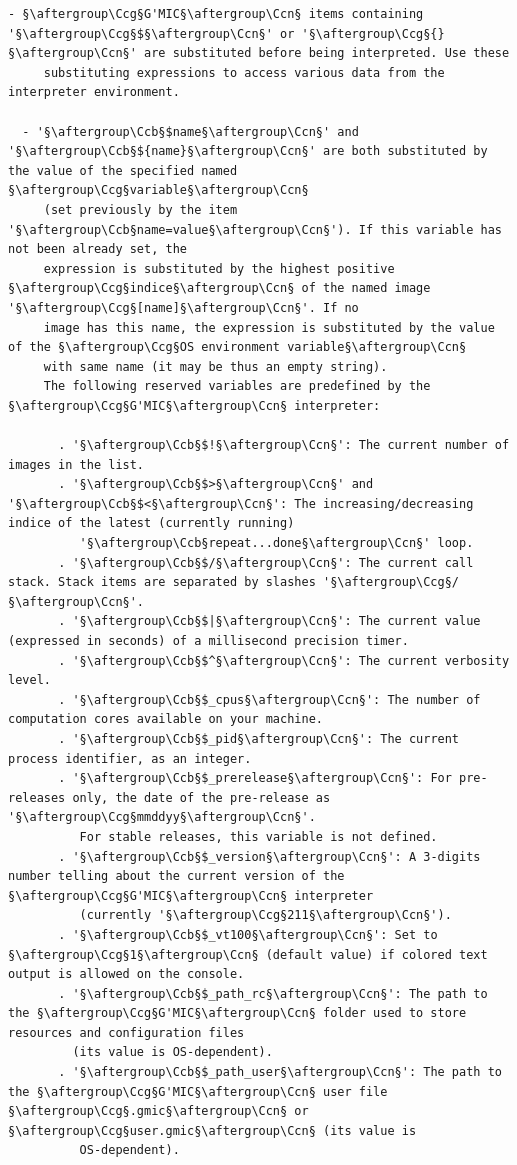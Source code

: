 \documentclass[a4paper,10.5pt,twoside]{book}
\def\Ccb{\color{cb}}
\def\Ccg{\color{cc}}
\def\Ccn{\color{black}}
\begin{document}
\begin{lstlisting}[escapechar=§]
  - §\aftergroup\Ccg§G'MIC§\aftergroup\Ccn§ items containing '§\aftergroup\Ccg§$§\aftergroup\Ccn§' or '§\aftergroup\Ccg§{}§\aftergroup\Ccn§' are substituted before being interpreted. Use these 
     substituting expressions to access various data from the interpreter environment. 
 
  - '§\aftergroup\Ccb§$name§\aftergroup\Ccn§' and '§\aftergroup\Ccb§${name}§\aftergroup\Ccn§' are both substituted by the value of the specified named §\aftergroup\Ccg§variable§\aftergroup\Ccn§ 
     (set previously by the item '§\aftergroup\Ccb§name=value§\aftergroup\Ccn§'). If this variable has not been already set, the 
     expression is substituted by the highest positive §\aftergroup\Ccg§indice§\aftergroup\Ccn§ of the named image '§\aftergroup\Ccg§[name]§\aftergroup\Ccn§'. If no 
     image has this name, the expression is substituted by the value of the §\aftergroup\Ccg§OS environment variable§\aftergroup\Ccn§ 
     with same name (it may be thus an empty string). 
     The following reserved variables are predefined by the §\aftergroup\Ccg§G'MIC§\aftergroup\Ccn§ interpreter: 
 
       . '§\aftergroup\Ccb§$!§\aftergroup\Ccn§': The current number of images in the list. 
       . '§\aftergroup\Ccb§$>§\aftergroup\Ccn§' and '§\aftergroup\Ccb§$<§\aftergroup\Ccn§': The increasing/decreasing indice of the latest (currently running) 
          '§\aftergroup\Ccb§repeat...done§\aftergroup\Ccn§' loop. 
       . '§\aftergroup\Ccb§$/§\aftergroup\Ccn§': The current call stack. Stack items are separated by slashes '§\aftergroup\Ccg§/§\aftergroup\Ccn§'. 
       . '§\aftergroup\Ccb§$|§\aftergroup\Ccn§': The current value (expressed in seconds) of a millisecond precision timer. 
       . '§\aftergroup\Ccb§$^§\aftergroup\Ccn§': The current verbosity level. 
       . '§\aftergroup\Ccb§$_cpus§\aftergroup\Ccn§': The number of computation cores available on your machine. 
       . '§\aftergroup\Ccb§$_pid§\aftergroup\Ccn§': The current process identifier, as an integer. 
       . '§\aftergroup\Ccb§$_prerelease§\aftergroup\Ccn§': For pre-releases only, the date of the pre-release as '§\aftergroup\Ccg§mmddyy§\aftergroup\Ccn§'. 
          For stable releases, this variable is not defined. 
       . '§\aftergroup\Ccb§$_version§\aftergroup\Ccn§': A 3-digits number telling about the current version of the §\aftergroup\Ccg§G'MIC§\aftergroup\Ccn§ interpreter 
          (currently '§\aftergroup\Ccg§211§\aftergroup\Ccn§'). 
       . '§\aftergroup\Ccb§$_vt100§\aftergroup\Ccn§': Set to §\aftergroup\Ccg§1§\aftergroup\Ccn§ (default value) if colored text output is allowed on the console. 
       . '§\aftergroup\Ccb§$_path_rc§\aftergroup\Ccn§': The path to the §\aftergroup\Ccg§G'MIC§\aftergroup\Ccn§ folder used to store resources and configuration files 
         (its value is OS-dependent). 
       . '§\aftergroup\Ccb§$_path_user§\aftergroup\Ccn§': The path to the §\aftergroup\Ccg§G'MIC§\aftergroup\Ccn§ user file §\aftergroup\Ccg§.gmic§\aftergroup\Ccn§ or §\aftergroup\Ccg§user.gmic§\aftergroup\Ccn§ (its value is 
          OS-dependent). 
 

\end{lstlisting}
\end{document}
